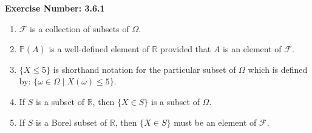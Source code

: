 \documentclass{article}
\begin{document}
\noindent \textbf{Exercise Number: 3.6.1}  %

\begin{enumerate}

\item $\mathcal{F}$ is a collection of subsets of $\Omega$.

\item $\mathbb{P}(A)$ is a well-defined element of $\mathbb{R}$ provided that $A$ is an element of $\mathcal{F}$. 

\item $\{X \leq 5\}$ is shorthand notation for the particular subset of $\Omega$ which is defined by: $\{\omega \in \Omega \mid X(\omega) \leq 5\}$.

\item If $S$ is a subset of $\mathbb{R}$, then $\{X \in S\}$ is a subset of $\Omega$.

\item If $S$ is a Borel subset of $\mathbb{R}$, then $\{X \in S\}$ must be an element of $\mathcal{F}$. 

\end{enumerate}
\end{document}
